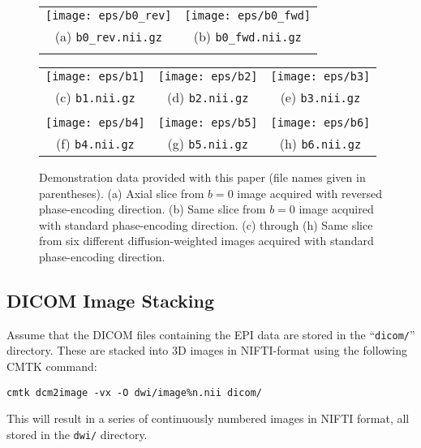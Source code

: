 \documentclass{InsightArticle}
\begin{document}
\begin{figure}[tbp]
\begin{center}
\begin{tabular}{cc}
\texttt{[image: eps/b0\_rev]} &
\texttt{[image: eps/b0\_fwd]} \\
(a) \texttt{b0\_rev.nii.gz} & (b)  \texttt{b0\_fwd.nii.gz}\\
\\
\end{tabular}
\begin{tabular}{ccc}
\texttt{[image: eps/b1]} &
\texttt{[image: eps/b2]} &
\texttt{[image: eps/b3]} \\
(c) \texttt{b1.nii.gz} & (d) \texttt{b2.nii.gz} & (e) \texttt{b3.nii.gz} \\
\\
\texttt{[image: eps/b4]} &
\texttt{[image: eps/b5]} &
\texttt{[image: eps/b6]} \\
(f) \texttt{b4.nii.gz} & (g) \texttt{b5.nii.gz} & (h) \texttt{b6.nii.gz} \\
\end{tabular}
\end{center}
\caption{Demonstration data provided with this paper (file names given in
  parentheses). (a) Axial slice from $b=0$ image acquired with reversed phase-encoding
  direction. (b) Same slice from $b=0$ image acquired with standard
  phase-encoding direction. (c) through (h) Same slice from six different
  diffusion-weighted images acquired with standard phase-encoding direction.}
\label{fig:B0FwBw}
\end{figure}

\subsection{DICOM Image Stacking}

Assume that the DICOM files containing the EPI data are stored in the
``\texttt{dicom/}'' directory. These are stacked into 3D images in
NIFTI-format using the following CMTK command:
\begin{verbatim}
cmtk dcm2image -vx -O dwi/image%n.nii dicom/
\end{verbatim}

This will result in a series of continuously numbered images in NIFTI format,
all stored in the \texttt{dwi/} directory.
\end{document}
